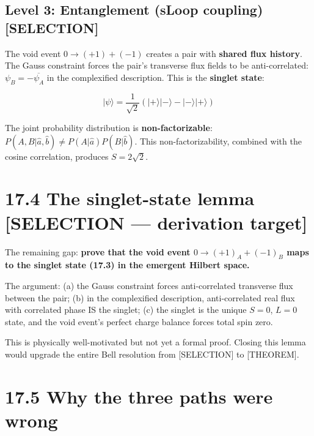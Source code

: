 \documentclass[
  11pt,
  letterpaper,
  twoside,
  openright]{book}
\begin{document}
\subsection{Level 3: Entanglement (sLoop coupling)
{[}SELECTION{]}}\label{level-3-entanglement-sloop-coupling-selection}

The void event \(0 \to (+1) + (-1)\) creates a pair with \textbf{shared
flux history}. The Gauss constraint forces the pair's transverse flux
fields to be anti-correlated: \(\psi_B = -\overline{\psi_A}\) in the
complexified description. This is the \textbf{singlet state}:

\[
|\psi\rangle = \frac{1}{\sqrt{2}}\left(|+\rangle|-\rangle - |-\rangle|+\rangle\right)
\tag{17.3}
\]

The joint probability distribution is \textbf{non-factorizable}:
\(P(A, B | \hat{a}, \hat{b}) \neq P(A | \hat{a}) P(B | \hat{b})\). This
non-factorizability, combined with the cosine correlation, produces
\(S = 2\sqrt{2}\).

\section{17.4 The singlet-state lemma {[}SELECTION --- derivation
target{]}}\label{the-singlet-state-lemma-selection-derivation-target}

\begin{ftdselection}

The remaining gap: \textbf{prove that the void event
\(0 \to (+1)_A + (-1)_B\) maps to the singlet state (17.3) in the
emergent Hilbert space.}

The argument: (a) the Gauss constraint forces anti-correlated transverse
flux between the pair; (b) in the complexified description,
anti-correlated real flux with correlated phase IS the singlet; (c) the
singlet is the unique \(S = 0\), \(L = 0\) state, and the void event's
perfect charge balance forces total spin zero.

This is physically well-motivated but not yet a formal proof. Closing
this lemma would upgrade the entire Bell resolution from {[}SELECTION{]}
to {[}THEOREM{]}.

\end{ftdselection}

\section{17.5 Why the three paths were
wrong}\label{why-the-three-paths-were-wrong}
\end{document}
